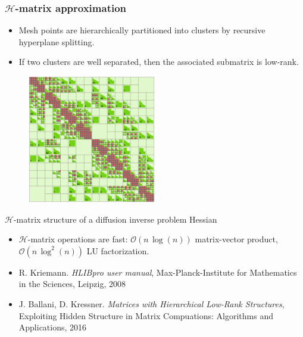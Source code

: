 \documentclass[10pt,final,xcolor=dvipsnames]{beamer}
\begin{document}
\begin{frame}
	\frametitle{$\mathcal{H}$-matrix approximation}
	
	\begin{minipage}{0.49\textwidth} 
		\begin{itemize}
			\item Mesh points are 
			hierarchically partitioned into
			clusters by recursive hyperplane splitting.
			\item If two clusters are well separated, then the associated
			submatrix is low-rank.
		\end{itemize}
	\end{minipage}
	\begin{minipage}{0.49\textwidth}
		\begin{figure}[htb]
			\centering\includegraphics[width=0.5\textwidth]
			{extraplots/heat_inverse_problem_Hfull_hmatrix.eps}
		\end{figure}
		\begin{center}
			{\tiny $\mathcal{H}$-matrix structure of a diffusion
				inverse problem Hessian \\}
		\end{center}
	\end{minipage}
	
	\begin{itemize}
		\item 
		$\mathcal{H}$-matrix operations are fast: $\mathcal{O}\left(n\,\log\left(n\right)\right)$
		matrix-vector product, $\mathcal{O}\left(n\,\log^{2}\left(n\right)\right)$
		LU factorization.
	\end{itemize}
	
	\scriptsize{
		\begin{itemize}
			\item[]  R. Kriemann.
			{\em HLIBpro user manual}, Max-Planck-Institute
			for Mathematics in the Sciences, Leipzig, 2008
			\item[]   J. Ballani, D. Kressner.
			{\em Matrices with Hierarchical Low-Rank Structures},
			Exploiting Hidden Structure in Matrix Compuations:
			Algorithms and Applications, 2016
		\end{itemize}
	}
	
\end{frame}
\end{document}
